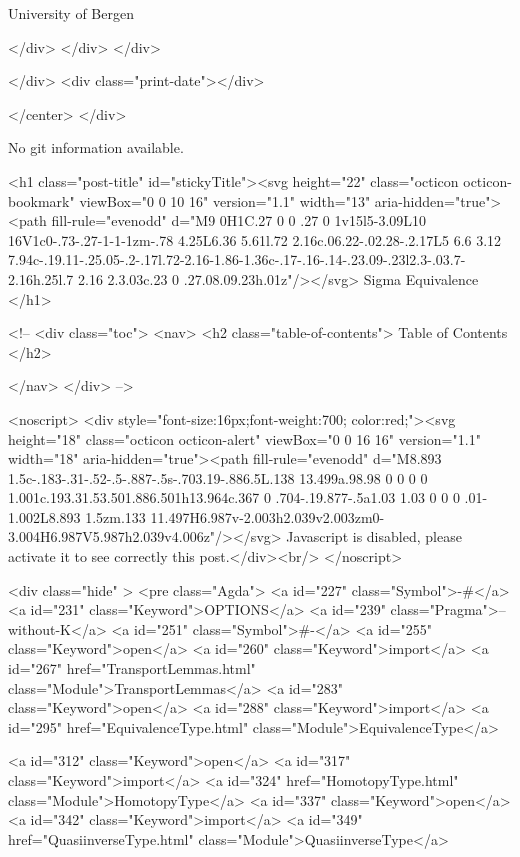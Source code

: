                   University of Bergen
                
                </div>
            </div>
          </div>
          
          
        </div>
        <div class="print-date"></div>
        
        
    </center>
  </div>

  
  No git information available.
  
  <h1 class="post-title" id="stickyTitle"><svg height="22" class="octicon octicon-bookmark" viewBox="0 0 10 16" version="1.1" width="13" aria-hidden="true"><path fill-rule="evenodd" d="M9 0H1C.27 0 0 .27 0 1v15l5-3.09L10 16V1c0-.73-.27-1-1-1zm-.78 4.25L6.36 5.61l.72 2.16c.06.22-.02.28-.2.17L5 6.6 3.12 7.94c-.19.11-.25.05-.2-.17l.72-2.16-1.86-1.36c-.17-.16-.14-.23.09-.23l2.3-.03.7-2.16h.25l.7 2.16 2.3.03c.23 0 .27.08.09.23h.01z"/></svg> Sigma Equivalence
  </h1>

  <!-- 
  <div class="toc">
    <nav>
    <h2 class="table-of-contents"> Table of Contents </h2>
      

    </nav>
  </div>
   -->

  <noscript>
  <div style="font-size:16px;font-weight:700; color:red;"><svg height="18" class="octicon octicon-alert" viewBox="0 0 16 16" version="1.1" width="18" aria-hidden="true"><path fill-rule="evenodd" d="M8.893 1.5c-.183-.31-.52-.5-.887-.5s-.703.19-.886.5L.138 13.499a.98.98 0 0 0 0 1.001c.193.31.53.501.886.501h13.964c.367 0 .704-.19.877-.5a1.03 1.03 0 0 0 .01-1.002L8.893 1.5zm.133 11.497H6.987v-2.003h2.039v2.003zm0-3.004H6.987V5.987h2.039v4.006z"/></svg> Javascript is disabled, please activate it to see correctly this post.</div><br/>
  </noscript>

  <div class="hide" >
<pre class="Agda">
<a id="227" class="Symbol">{-#</a> <a id="231" class="Keyword">OPTIONS</a> <a id="239" class="Pragma">--without-K</a> <a id="251" class="Symbol">#-}</a>
<a id="255" class="Keyword">open</a> <a id="260" class="Keyword">import</a> <a id="267" href="TransportLemmas.html" class="Module">TransportLemmas</a>
<a id="283" class="Keyword">open</a> <a id="288" class="Keyword">import</a> <a id="295" href="EquivalenceType.html" class="Module">EquivalenceType</a>

<a id="312" class="Keyword">open</a> <a id="317" class="Keyword">import</a> <a id="324" href="HomotopyType.html" class="Module">HomotopyType</a>
<a id="337" class="Keyword">open</a> <a id="342" class="Keyword">import</a> <a id="349" href="QuasiinverseType.html" class="Module">QuasiinverseType</a>

